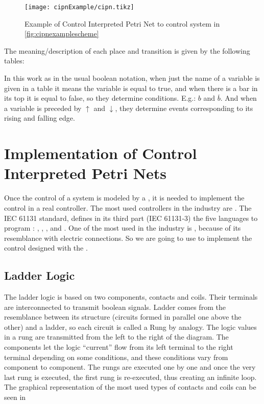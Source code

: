 \begin{figure}[H]
  \centering \texttt{[image: cipnExample/cipn.tikz]}
  \caption{Example of Control Interpreted Petri Net to control
    system in \autoref{fig:cipnexamplescheme}}
  \label{fig:cipnexample}
\end{figure}

The meaning\slash description of each place and transition is given by the
following tables:




In this work as in the usual boolean notation, when just the name of a variable is given in a table it means the
variable is equal to true, and when there is a bar in its top it is equal to
false, so they determine conditions. E.g.: $b$ and $\overline{b}$.
And when a variable is preceded by $\uparrow$ and $\downarrow$, they determine
events corresponding to its rising and falling edge.

\usetikzlibrary{arrows,shapes,circuits.plc.ladder,external}
\section{Implementation of Control Interpreted Petri Nets}
\label{sec:implementPetriNets}
Once the control of a system is modeled by a \CIPN, it
is needed to implement the control in a real controller. The most used
controllers in the industry are \PLCs. The IEC 61131 standard,
defines in its third part (IEC 61131-3) the 
five languages to program \PLCs: \LD, \FBD, \ST, \IL{} and \SFC. One of the most used in the industry is \LD, because of its
resemblance with electric connections. So we are going to use \LD{} to implement the
control designed with the \CIPN.

\subsection{Ladder Logic}
\label{sec:ladder}

The ladder logic is based on two components, contacts and coils. Their terminals are
interconnected to transmit boolean signals.
Ladder comes from the resemblance between its structure (circuits formed in
parallel one above the other) and a ladder, so each circuit is called a Rung by analogy. The logic
values in a \LD{} rung
are transmitted from the left to the right of the diagram. The components let
the logic ``current'' flow from its left terminal to the right terminal
depending on some conditions, and these conditions vary from component to
component.
The rungs are executed one by one and once the very last rung is executed,
the first rung is re-executed, thus creating an infinite loop. 
 The graphical representation of the most used types of contacts and coils
can be seen in 


